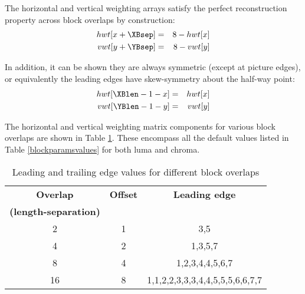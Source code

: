 \begin{informative}
The horizontal and vertical weighting arrays satisfy the perfect reconstruction property across block overlaps by construction:
\begin{eqnarray*}
hwt[x+\XBsep] & = & 8 - hwt[x] \\ 
vwt[y+\YBsep] & = & 8 - vwt[y]  
\end{eqnarray*}

In addition, it can be shown they are always symmetric (except at picture edges), or
equivalently the leading edges have skew-symmetry about the half-way point:
\begin{eqnarray*}
hwt[\XBlen-1-x] & =  & hwt[x] \\
vwt[\YBlen-1-y] & = & vwt[y] 
\end{eqnarray*}

The horizontal and vertical weighting matrix components for various block
 overlaps are shown in Table \ref{table:leadingedges}. 
These encompass all the default values listed 
in Table \ref{blockparamsvalues} for both luma and chroma.
\end{informative}
\begin{table}[!ht]
\centering
\begin{tabular}{|c|c|c|}
\hline
\rowcolor[gray]{0.75}\bf{Overlap}  & \bf{Offset} & \bf{Leading edge} \\
\rowcolor[gray]{0.75}\bf{(length-separation)} & & \\
\hline
2 & 1 & 3,5\\
\hline
4 & 2 & 1,3,5,7\\
\hline
8 & 4 & 1,2,3,4,4,5,6,7\\
\hline
16 & 8 & 1,1,2,2,3,3,3,4,4,5,5,5,6,6,7,7 \\
\hline
\end{tabular}
\caption{Leading and trailing edge values for different block overlaps}
\label{table:leadingedges}
\end{table}

